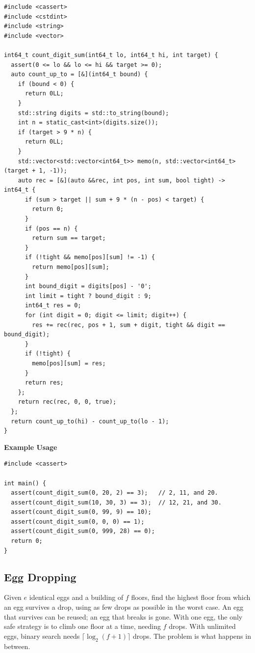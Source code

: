 \begin{lstlisting}[style=cpp]
#include <cassert>
#include <cstdint>
#include <string>
#include <vector>

int64_t count_digit_sum(int64_t lo, int64_t hi, int target) {
  assert(0 <= lo && lo <= hi && target >= 0);
  auto count_up_to = [&](int64_t bound) {
    if (bound < 0) {
      return 0LL;
    }
    std::string digits = std::to_string(bound);
    int n = static_cast<int>(digits.size());
    if (target > 9 * n) {
      return 0LL;
    }
    std::vector<std::vector<int64_t>> memo(n, std::vector<int64_t>(target + 1, -1));
    auto rec = [&](auto &&rec, int pos, int sum, bool tight) -> int64_t {
      if (sum > target || sum + 9 * (n - pos) < target) {
        return 0;
      }
      if (pos == n) {
        return sum == target;
      }
      if (!tight && memo[pos][sum] != -1) {
        return memo[pos][sum];
      }
      int bound_digit = digits[pos] - '0';
      int limit = tight ? bound_digit : 9;
      int64_t res = 0;
      for (int digit = 0; digit <= limit; digit++) {
        res += rec(rec, pos + 1, sum + digit, tight && digit == bound_digit);
      }
      if (!tight) {
        memo[pos][sum] = res;
      }
      return res;
    };
    return rec(rec, 0, 0, true);
  };
  return count_up_to(hi) - count_up_to(lo - 1);
}
\end{lstlisting}
\textbf{Example Usage}\par
\begin{lstlisting}[style=cpp]
#include <cassert>

int main() {
  assert(count_digit_sum(0, 20, 2) == 3);   // 2, 11, and 20.
  assert(count_digit_sum(10, 30, 3) == 3);  // 12, 21, and 30.
  assert(count_digit_sum(0, 99, 9) == 10);
  assert(count_digit_sum(0, 0, 0) == 1);
  assert(count_digit_sum(0, 999, 28) == 0);
  return 0;
}
\end{lstlisting}
\subsection{Egg Dropping}
\label{sec:1.3.7}
Given $e$ identical eggs and a building of $f$ floors, find the highest floor from which an egg survives a drop, using as few drops as possible in the worst case. An egg that survives can be reused; an egg that breaks is gone. With one egg, the only safe strategy is to climb one floor at a time, needing $f$ drops. With unlimited eggs, binary search needs $\lceil \log_2(f + 1) \rceil$ drops. The problem is what happens in between.

